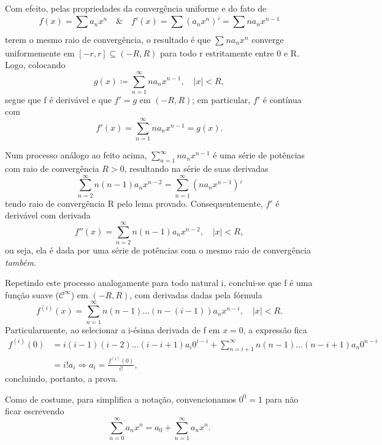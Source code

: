 \documentclass[../analysisII_notes.tex]{subfiles}
\begin{document}
\begin{proof*}
	Com efeito, pelas propriedades da convergência uniforme e do fato de
	\[
		f(x)=\sum\limits_{}^{}a_{n}x^{n} \quad\&\quad f'(x) = \sum\limits_{}^{}(a_{n}x^{n})' = \sum\limits_{}^{}na_{n}x^{n-1}
	\]
	terem o mesmo raio de convergência, o resultado é que \(\sum\limits_{}^{}na_{n}x^{n}\) converge uniformemente em \([-r, r]\subseteq (-R, R)\) para todo r estritamente entre 0 e R. Logo, colocando
	\[
		g(x)\coloneqq \sum\limits_{n=1}^{\infty}na_{n}x^{n-1},\quad |x|<R,
	\]
	segue que f é derivável e que \(f'= g\) em \((-R, R)\); em particular, \(f'\) é contínua com
	\[
		f'(x) = \sum\limits_{n=1}^{\infty}na_{n}x^{n-1} = g(x).
	\]

	Num processo análogo ao feito acima, \(\sum\limits_{n=1}^{\infty}na_{n}x^{n-1}\) é uma série de potências com raio de convergência \(R > 0\), resultando na série de suas derivadas
	\[
		\sum\limits_{n=2}^{\infty}n(n-1)a_{n}x^{n-2} = \sum\limits_{n=1}^{\infty}(na_{n}x^{n-1})'
	\]
	tendo raio de convergência R pelo lema provado. Consequentemente, \(f'\) é derivável com derivada
	\[
		f''(x) = \sum\limits_{n=2}^{\infty}n(n-1)a_{n}x^{n-2},\quad |x| < R,
	\]
	ou seja, ela é dada por uma série de potências com o mesmo raio de convergência \textit{também}.

	Repetindo este processo analogamente para todo natural i, conclui-se que f é uma função suave (\(\mathcal{C}^{\infty}\)) em \((-R, R)\), com derivadas dadas pela fórmula
	\[
		f^{(i)}(x) = \sum\limits_{n=1}^{\infty}n(n-1)\dotsc (n-(i-1))a_{n}x^{n-i},\quad |x|<R.
	\]
	Particularmente, ao selecionar a i-ésima derivada de f em \(x=0\), a expressão fica
	\begin{align*}
		f^{(i)}(0) & = i(i-1)(i-2)\dotsc (i-i+1)a_{i}0^{i-i} + \sum\limits_{n=i+1}^{\infty}n(n-1)\dotsc (n-i+1)a_{n}0^{n-i} \\
		           & = i!a_{i} \Rightarrow a_{i} = \frac{f^{(i)}(0)}{i!},
	\end{align*}
	concluindo, portanto, a prova. \qedsymbol
\end{proof*}
\begin{tcolorbox}[
		skin=enhanced,
		title=Observação,
		fonttitle=\bfseries,
		colframe=black,
		colbacktitle=cyan!75!white,
		colback=cyan!15,
		colbacklower=black,
		coltitle=black,
		drop fuzzy shadow,
	]
	Como de costume, para simplifica a notação, convencionamos \(0^{0} = 1\) para não ficar escrevendo
	\[
		\sum\limits_{n=0}^{\infty}a_{n}x^{n} = a_{0} + \sum\limits_{n=1}^{\infty}a_{n}x^{n}.
	\]
\end{tcolorbox}
\end{document}
